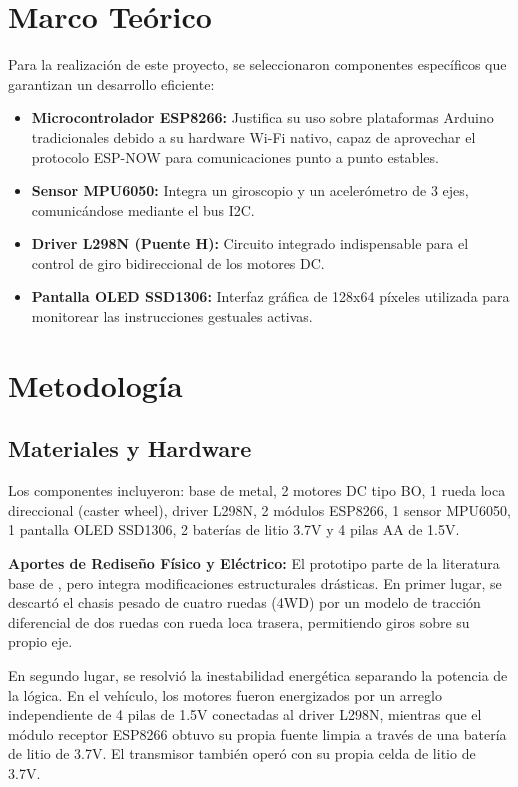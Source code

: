 \documentclass[conference]{IEEEtran}
\begin{document}
\section{Marco Teórico}
Para la realización de este proyecto, se seleccionaron componentes específicos que garantizan un desarrollo eficiente:
\begin{itemize}
    \item \textbf{Microcontrolador ESP8266:} Justifica su uso sobre plataformas Arduino tradicionales debido a su hardware Wi-Fi nativo, capaz de aprovechar el protocolo ESP-NOW para comunicaciones punto a punto estables.
    \item \textbf{Sensor MPU6050:} Integra un giroscopio y un acelerómetro de 3 ejes, comunicándose mediante el bus I2C.
    \item \textbf{Driver L298N (Puente H):} Circuito integrado indispensable para el control de giro bidireccional de los motores DC.
    \item \textbf{Pantalla OLED SSD1306:} Interfaz gráfica de 128x64 píxeles utilizada para monitorear las instrucciones gestuales activas.
\end{itemize}

\section{Metodología}
\subsection{Materiales y Hardware}
Los componentes incluyeron: base de metal, 2 motores DC tipo BO, 1 rueda loca direccional (caster wheel), driver L298N, 2 módulos ESP8266, 1 sensor MPU6050, 1 pantalla OLED SSD1306, 2 baterías de litio 3.7V y 4 pilas AA de 1.5V.

\textbf{Aportes de Rediseño Físico y Eléctrico:} 
El prototipo parte de la literatura base de \cite{makerscience}, pero integra modificaciones estructurales drásticas. En primer lugar, se descartó el chasis pesado de cuatro ruedas (4WD) por un modelo de tracción diferencial de dos ruedas con rueda loca trasera, permitiendo giros sobre su propio eje. 

En segundo lugar, se resolvió la inestabilidad energética separando la potencia de la lógica. En el vehículo, los motores fueron energizados por un arreglo independiente de 4 pilas de 1.5V conectadas al driver L298N, mientras que el módulo receptor ESP8266 obtuvo su propia fuente limpia a través de una batería de litio de 3.7V. El transmisor también operó con su propia celda de litio de 3.7V.
\end{document}
